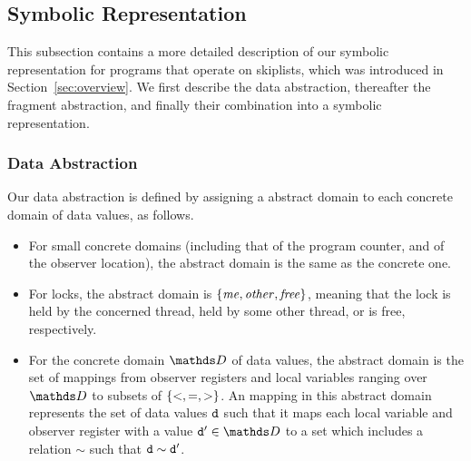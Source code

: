 
\subsection{Symbolic Representation}
\label{subsect:symbrep}
This subsection contains a more detailed description of our symbolic representation for programs that
operate on skiplists, which was introduced in Section~\ref{sec:overview}.
We first describe the data abstraction,
thereafter the fragment abstraction, and finally their combination
into a symbolic representation.

\vspace*{-0.6cm}
\subsubsection{Data Abstraction}
Our data abstraction is defined by assigning a
abstract domain to each concrete domain of data values, as follows.
\begin{itemize}
\item For small concrete domains (including that of the program counter, and
  of the observer location),
  the abstract domain is the same as the concrete one.
\item
  For locks, the abstract domain is $\left\{\mathit{me},\mathit{other},\mathit{free}\right\}$,
  meaning that the lock is held by the concerned thread, held by some other thread, or is
  free, respectively.
\item For the concrete domain $\ddomain$ of data values, the abstract domain
  is the set of mappings from observer registers and local variables
  ranging over $\ddomain$ to subsets of $\left\{<,=,>\right\}$.
  An mapping in this abstract domain represents the set of data values $\tt d$
  such that it maps each local variable and observer register with a value ${\tt d'} \in \ddomain$
  to a set which includes a relation $\sim$ such that $\tt d \sim \tt d'$.
\end{itemize}

